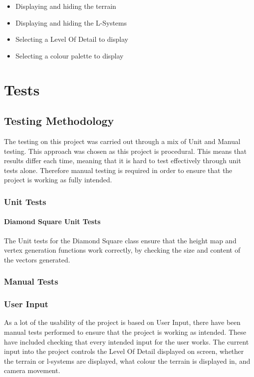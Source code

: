 \documentclass[a4paper,10pt]{report}
\begin{document}
\begin{itemize}
    \item Displaying and hiding the terrain
    \item Displaying and hiding the L-Systems
    \item Selecting a Level Of Detail to display
    \item Selecting a colour palette to display
\end{itemize}

\chapter{Tests}
\section{Testing Methodology}
The testing on this project was carried out through a mix of Unit and Manual testing. This approach was chosen as this project is procedural. This means that results differ each time, meaning that it is hard to test effectively through unit tests alone. Therefore manual testing is required in order to ensure that the project is working as fully intended.

\subsection{Unit Tests}
\subsubsection{Diamond Square Unit Tests}

The Unit tests for the Diamond Square class ensure that the height map and vertex generation functions work correctly, by checking the size and content of the vectors generated. 

\subsection{Manual Tests}

\subsection{User Input}

As a lot of the usability of the project is based on User Input, there have been manual tests performed to ensure that the project is working as intended. These have included checking that every intended input for the user works. The current input into the project controls the Level Of Detail displayed on screen, whether the terrain or l-systems are displayed, what colour the terrain is displayed in, and camera movement.
\end{document}
